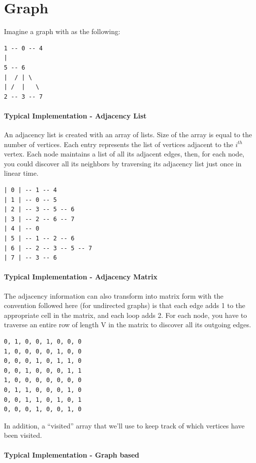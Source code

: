 \documentclass[]{book}
\begin{document}
\hypertarget{graph}{%
\chapter{Graph}\label{graph}}

Imagine a graph with as the following:

\begin{verbatim}
1 -- 0 -- 4
|
5 -- 6
|  / | \
| /  |   \
2 -- 3 -- 7
\end{verbatim}

\subsubsection{Typical Implementation - Adjacency List}

An adjacency list is created with an array of lists. Size of the array is equal to the number of vertices. Each entry
represents the list of vertices adjacent to the \(i^{th}\) vertex. Each node maintains a list of all its adjacent edges,
then, for each node, you could discover all its neighbors by traversing its adjacency list just once in linear time.

\begin{verbatim}
| 0 | -- 1 -- 4
| 1 | -- 0 -- 5
| 2 | -- 3 -- 5 -- 6
| 3 | -- 2 -- 6 -- 7
| 4 | -- 0
| 5 | -- 1 -- 2 -- 6
| 6 | -- 2 -- 3 -- 5 -- 7
| 7 | -- 3 -- 6
\end{verbatim}

\subsubsection{Typical Implementation - Adjacency Matrix}

The adjacency information can also transform into matrix form with the convention followed here (for undirected graphs)
is that each edge adds 1 to the appropriate cell in the matrix, and each loop adds 2. For each node, you have to
traverse an entire row of length V in the matrix to discover all its outgoing edges.

\begin{verbatim}
0, 1, 0, 0, 1, 0, 0, 0
1, 0, 0, 0, 0, 1, 0, 0
0, 0, 0, 1, 0, 1, 1, 0
0, 0, 1, 0, 0, 0, 1, 1
1, 0, 0, 0, 0, 0, 0, 0
0, 1, 1, 0, 0, 0, 1, 0
0, 0, 1, 1, 0, 1, 0, 1
0, 0, 0, 1, 0, 0, 1, 0
\end{verbatim}

In addition, a ``visited'' array that we'll use to keep track of which vertices have been visited.

\subsubsection{Typical Implementation - Graph based}
\end{document}
